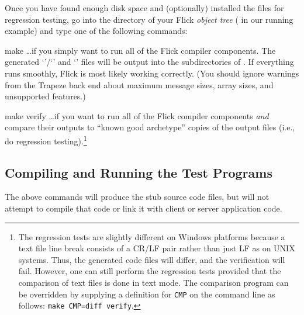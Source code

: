 Once you have found enough disk space and (optionally) installed the files for
regression testing, go into the  directory of your Flick
\emph{object tree} ( in our running example) and type one
of the following commands:

\begin{commandlist}
  \item[make]
  \ldots{}if you simply want to run all of the Flick compiler components.  The
  generated `'/`' and `' files will be
  output into the  subdirectories of .  If
  everything runs smoothly, Flick is most likely working correctly.  (You
  should ignore warnings from the Trapeze back end about maximum message sizes,
  array sizes, and unsupported features.)

  \item[make verify]
  \ldots{}if you want to run all of the Flick compiler components \emph{and}
  compare their outputs to ``known good archetype'' copies of the output files
  (i.e., do regression testing).\footnote{The regression tests are slightly
  different on Windows platforms because a text file line break consists of a
  CR/LF pair rather than just LF as on UNIX systems.  Thus, the generated code
  files will differ, and the verification will fail.  However, one can still
  perform the regression tests provided that the comparison of text files is
  done in text mode.  The comparison program can be overridden by supplying a
  definition for \texttt{CMP} on the command line as follows:
  \texttt{make~CMP=diff~verify}.}
\end{commandlist}



\subsection{Compiling and Running the Test Programs}
\label{subsec:Compiling and Running the Test Programs}

The above commands will produce the stub source code files, but will not
attempt to compile that code or link it with client or server application code.

